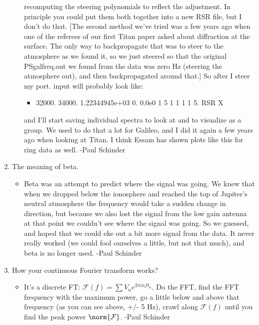 \documentclass[crop=false,class=article,oneside]{standalone}
\begin{document}
\begin{enumerate}
\begin{itemize}
              recomputing the steering polynomials to reflect the
              adjustment.  In principle you could put them both
              together into a new RSR file, but I don’t do that.
              [The second method we’ve tried was a few years ago
              when one of the referees of our first Titan paper
              asked about diffraction at the surface.  The only
              way to backpropagate that was to steer to the atmosphere
              as we found it, so we just steered so that the original
              PSgalfreq.out we found from the data was zero Hz
              (steering the atmosphere out), and then backpropagated
              around that.] So after I steer my port.
              input will probably look like:
            \begin{itemize}
                \item 32000. 34000. 1.22344945e+03 0. 0.0e0
                      1 5 1 1 1 1 5. RSR X
            \end{itemize}
            and I’ll start saving individual spectra to look at and
            to visualize as a group.  We used to do that a lot for
            Galileo, and I did it again a few years ago when looking
            at Titan.  I think Essam has shown plots like this for
            ring data as well. -Paul Schinder
    \end{itemize}
    \item The meaning of beta.
    \begin{itemize}
        \item Beta was an attempt to predict where the signal was going.  We knew that when we dropped below the ionosphere and reached the top of Jupiter’s neutral atmosphere the frequency would take a sudden change in direction, but because we also lost the signal from the low gain antenna at that point we couldn’t see where the signal was going.  So we guessed, and hoped that we could eke out a bit more signal from the data.  It never really worked (we could fool ourselves a little, but not that much), and beta is no longer used. -Paul Schinder
    \end{itemize}
    \item How your continuous Fourier transform works?
    \begin{itemize}
        \item It’s a discrete FT: $\mathcal{F}(f) = \sum V_n e^{2\pi i n f t_n}$. Do the FFT, find the FFT frequency with the maximum power, go a little below and above that frequency (as you can see above, +/- 5 Hz), crawl along $\mathcal{F}(f)$ until you find the peak power $\norm{\mathcal{F}}$. -Paul Schinder

\end{itemize}
\end{enumerate}
\end{document}
